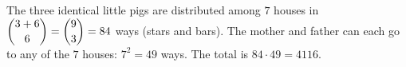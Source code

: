 The three identical little pigs are distributed among $7$ houses in $\dbinom{3+6}{6}=\dbinom{9}{3}=84$ ways (stars and bars). The mother and father can each go to any of the $7$ houses: $7^2=49$ ways. The total is $84\cdot49=\boxed{4116}$.
